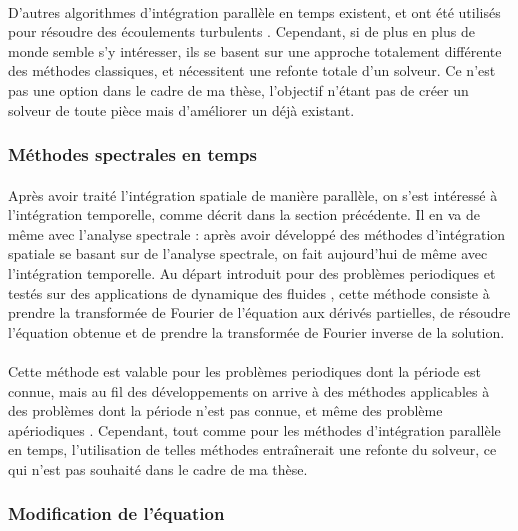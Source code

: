       \paragraph{}
      D'autres algorithmes d'intégration parallèle en temps existent, et ont été utilisés pour résoudre des écoulements turbulents \cite{Lunet2018}.
      Cependant, si de plus en plus de monde semble s'y intéresser, ils se basent sur une approche totalement différente des méthodes classiques, et nécessitent une refonte totale d'un solveur.
      Ce n'est pas une option dans le cadre de ma thèse, l'objectif n'étant pas de créer un solveur de toute pièce mais d'améliorer un déjà existant.


    \subsubsection{Méthodes spectrales en temps}

      \paragraph{}
      Après avoir traité l'intégration spatiale de manière parallèle, on s'est intéressé à l'intégration temporelle, comme décrit dans la section précédente.
      Il en va de même avec l'analyse spectrale : après avoir développé des méthodes d'intégration spatiale se basant sur de l'analyse spectrale, on fait aujourd'hui de même avec l'intégration temporelle.
      Au départ introduit pour des problèmes periodiques et testés sur des applications de dynamique des fluides \cite{GopinathJamesony2005, GopinathJameson2006}, cette méthode consiste à prendre la transformée de Fourier de l'équation aux dérivés partielles, de résoudre l'équation obtenue et de prendre la transformée de Fourier inverse de la solution.

      \paragraph{}
      Cette méthode est valable pour les problèmes periodiques dont la période est connue, mais au fil des développements on arrive à des méthodes applicables à des problèmes dont la période n'est pas connue, et même des problème apériodiques \cite{EkiciDjeddiLiEtAl2020}.
      Cependant, tout comme pour les méthodes d'intégration parallèle en temps, l'utilisation de telles méthodes entraînerait une refonte du solveur, ce qui n'est pas souhaité dans le cadre de ma thèse.


    \subsubsection{Modification de l'équation}

